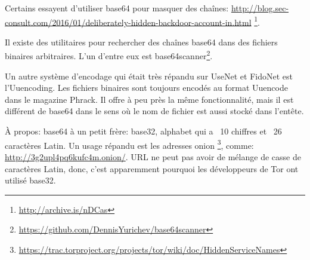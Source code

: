 Certains essayent d'utiliser base64 pour masquer des chaînes:
\url{http://blog.sec-consult.com/2016/01/deliberately-hidden-backdoor-account-in.html}%
\footnote{\url{http://archive.is/nDCas}}.

Il existe des utilitaires pour rechercher des chaînes base64 dans des fichiers binaires
arbitraires.
L'un d'entre eux est base64scanner\footnote{\url{https://github.com/DennisYurichev/base64scanner}}.

Un autre système d'encodage qui était très répandu sur UseNet et FidoNet est l'Uuencoding.
Les fichiers binaires sont toujours encodés au format Uuencode dans le magazine Phrack.
Il offre à peu près la même fonctionnalité, mais il est différent de base64 dans
le sens où le nom de fichier est aussi stocké dans l'entête.

À propos: base64 à un petit frère: base32, alphabet qui a ~10 chiffres et ~26 caractères Latin.
Un usage répandu est les adresses onion%
\footnote{\url{https://trac.torproject.org/projects/tor/wiki/doc/HiddenServiceNames}},
comme: \\
\url{http://3g2upl4pq6kufc4m.onion/}.
\ac{URL} ne peut pas avoir de mélange de casse de caractères Latin, donc, c'est apparemment
pourquoi les développeurs de Tor ont utilisé base32.

